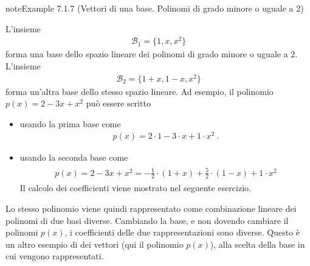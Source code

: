 \documentclass[letterpaper,10pt,italian]{jupyterBook}
\begin{document}
\begin{sphinxadmonition}{note}{Example 7.1.7 (Vettori di una base. Polinomi di grado minore o uguale a 2)}



\sphinxAtStartPar
L’insieme
\begin{equation*}
\begin{split}\mathcal{B}_1 = \{ 1, x, x^2  \} \end{split}
\end{equation*}
\sphinxAtStartPar
forma una base dello spazio lineare dei polinomi di grado minore o uguale a 2. L’insieme
\begin{equation*}
\begin{split}\mathcal{B}_2 = \{ 1+x, 1-x, x^2 \}\end{split}
\end{equation*}
\sphinxAtStartPar
forma un’altra base dello stesso spazio lineare. Ad esempio, il polinomio \(p(x) = 2 - 3 x + x^2\) può essere scritto
\begin{itemize}
\item {} 
\sphinxAtStartPar
usando la prima base come
\begin{equation*}
\begin{split}p(x) = 2 \cdot 1 - 3 \cdot x + 1 \cdot x^2 \ .\end{split}
\end{equation*}
\item {} 
\sphinxAtStartPar
usando la seconda base come
\begin{equation*}
\begin{split}\begin{aligned}
     p(x) = 2 - 3  x + x^2 = - \frac{1}{2} \cdot ( 1 + x ) + \frac{5}{2} \cdot ( 1 - x ) + 1 \cdot x^2
   \end{aligned}\end{split}
\end{equation*}
\sphinxAtStartPar
Il calcolo dei coefficienti viene mostrato nel seguente esercizio.

\end{itemize}

\sphinxAtStartPar
Lo stesso polinomio viene quindi rappresentato come combinazione lineare dei polinomi di due basi diverse. Cambiando la base, e non dovendo cambiare il polinomi \(p(x)\), i coefficienti delle due rappresentazioni sono diverse. Questo è un altro esempio di  dei vettori (qui il polinomio \(p(x)\)), alla scelta della base in cui vengono rappresentati.
\end{sphinxadmonition}
 \label{exercise:ex-vectors-polynomials}
\end{document}
